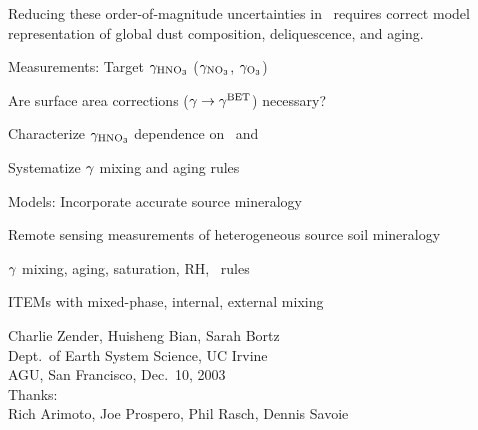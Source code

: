 \documentclass[final,dvips]{foils}
\begin{document}
\rotatefoilhead{\bgl
\Large\textcolor{blue}{\hfill Future Prospects \hfill}}\vspace{-0.75in}\large
Reducing these order-of-magnitude uncertainties in \dlthchOt\ requires   
correct model representation of global dust composition, deliquescence,
and aging.
\begin{enumerate*}
\item Measurements: Target $\mssuptcffHNOt$ ($\mssuptcffNOt$, $\mssuptcffOt$)
\begin{itemize*}
\item Are surface area corrections ($\gamma \rightarrow \gamma^{\mathrm{BET}}$) necessary?
\item Characterize $\mssuptcffHNOt$ dependence on \RH\ and \CaCOt\ \cite[]{KGL03}
\item Systematize $\gamma$ mixing and aging rules
\end{itemize*}
\item Models: Incorporate accurate source mineralogy
\begin{itemize*}
\item Remote sensing measurements of heterogeneous source soil
  mineralogy \cite[]{TSG02} 
\item $\gamma$ mixing, aging, saturation, RH, \CaCOt\ rules
\item ITEMs with mixed-phase, internal, external mixing
\end{itemize*}
\end{enumerate*}

\vspace{-0.5in}\LARGE
\begin{center}
Charlie Zender, Huisheng Bian, Sarah Bortz\\
Dept.\ of Earth System Science, UC Irvine\\
\bigskip
\bigskip
\bigskip
AGU, San Francisco, Dec.~10, 2003\\
{\large Thanks:\\ Rich Arimoto, Joe Prospero, Phil Rasch, Dennis Savoie}
\normalsize
\end{center}
\end{document}
